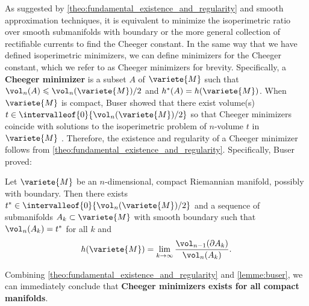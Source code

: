 As suggested by \ref{theo:fundamental_existence_and_regularity} and smooth approximation techniques, it is equivalent to minimize the isoperimetric ratio over smooth submanifolds with boundary or the more general collection of rectifiable currents to find the Cheeger constant. In the same way that we have defined isoperimetric minimizers, we can define minimizers for the Cheeger constant, which we refer to as Cheeger minimizers for brevity. Specifically, a \textbf{Cheeger minimizer} is a subset $A$ of $\variete{M}$ such that $\vol_n(A) \leqslant \vol_n(\variete{M})/2$ and $h^\ast(A) = h(\variete{M})$. When $\variete{M}$ is compact, Buser showed that there exist volume(s) $t \in \intervalleof{0}{\vol_n(\variete{M})/2}$ so that Cheeger minimizers coincide with solutions to the isoperimetric problem of $n$-volume $t$ in $\variete{M}$ \cite[Remark 3.3, Lemma 3.4]{buser_note_1982}. Therefore, the existence and regularity of a Cheeger minimizer follows from \ref{theo:fundamental_existence_and_regularity}. Specifically, Buser proved:

\begin{lemme} \label{lemme:buser}
Let $\variete{M}$ be an $n$-dimensional, compact Riemannian manifold, possibly with boundary. Then there exists $t^\ast \in \intervalleof{0}{\vol_n(\variete{M})/2}$ and a sequence of submanifolds $A_k \subset \variete{M}$ with smooth boundary such that $\vol_n(A_k) = t^\ast$ for all $k$ and
\[
h(\variete{M}) = \lim_{k \to \infty} \frac{\vol_{n-1}(\partial A_k)}{\vol_n(A_k)}.
\]
\end{lemme}

Combining \ref{theo:fundamental_existence_and_regularity} and \ref{lemme:buser}, we can immediately conclude that \textbf{Cheeger minimizers exists for all compact manifolds}.